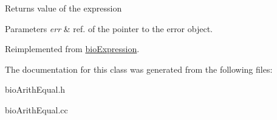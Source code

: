 \begin{DoxyReturn}{Returns}
value of the expression 
\end{DoxyReturn}

\begin{DoxyParams}{Parameters}
{\em err} & ref. of the pointer to the error object. \\
\hline
\end{DoxyParams}


Reimplemented from \hyperlink{classbio_expression_af58662a5d4d456f15bc4f2c9bd4f8a5b}{bio\+Expression}.



The documentation for this class was generated from the following files\+:\begin{DoxyCompactItemize}
\item 
bio\+Arith\+Equal.\+h\item 
bio\+Arith\+Equal.\+cc\end{DoxyCompactItemize}
